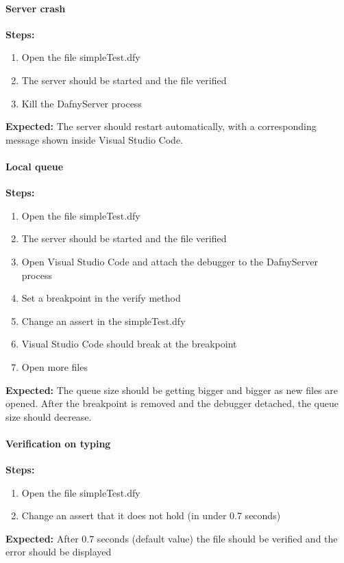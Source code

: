 \paragraph{Server crash}
\textbf{\newline Steps:}
\begin{enumerate}
	\item Open the file simpleTest.dfy
	\item The server should be started and the file verified
	\item Kill the DafnyServer process
\end{enumerate}
\textbf{\newline Expected:}
The server should restart automatically, with a corresponding message shown inside Visual Studio Code. 

\paragraph{Local queue}
\textbf{\newline Steps:}
\begin{enumerate}
	\item Open the file simpleTest.dfy
	\item The server should be started and the file verified
	\item Open Visual Studio Code and attach the debugger to the DafnyServer process
	\item Set a breakpoint in the verify method
	\item Change an assert in the simpleTest.dfy 
	\item Visual Studio Code should break at the breakpoint
	\item Open more files
\end{enumerate}
\textbf{\newline Expected:}
The queue size should be getting bigger and bigger as new files are opened. After the breakpoint is removed and the debugger detached, the queue size should decrease. 

\paragraph{Verification on typing}
\textbf{\newline Steps:}
\begin{enumerate}
	\item Open the file simpleTest.dfy
	\item Change an assert that it does not hold (in under 0.7 seconds)
\end{enumerate}
\textbf{\newline Expected:}
After 0.7 seconds (default value) the file should be verified and the error should be displayed 

